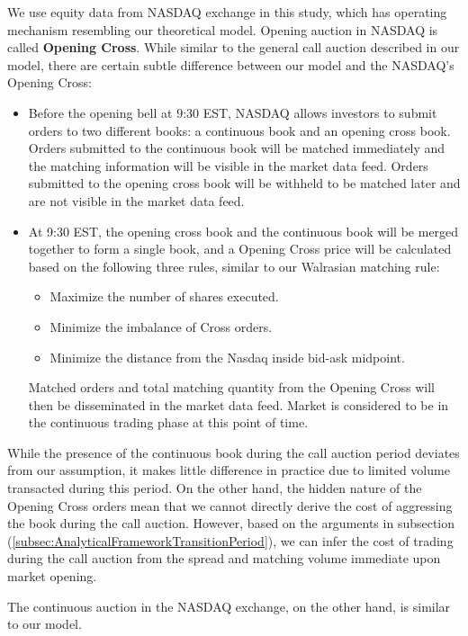 We use equity data from NASDAQ exchange in this study, which has operating mechanism resembling our theoretical model. Opening auction in NASDAQ is called \textbf{Opening Cross}. While similar to the general call auction described in our model, there are certain subtle difference between our model and the NASDAQ's Opening Cross:
\begin{itemize}
  \item Before the opening bell at 9:30 EST, NASDAQ allows investors to submit orders to two different books: a continuous book and an opening cross book. Orders submitted to the continuous book will be matched immediately and the matching information will be visible in the market data feed. Orders submitted to the opening cross book will be withheld to be matched later and are not visible in the market data feed.
  \item At 9:30 EST, the opening cross book and the continuous book will be merged together to form a single book, and a Opening Cross price will be calculated based on the following three rules, similar to our Walrasian matching rule:
        \begin{itemize}
          \item Maximize the number of shares executed.
          \item Minimize the imbalance of Cross orders.
          \item Minimize the distance from the Nasdaq inside bid-ask midpoint.
        \end{itemize}
        Matched orders and total matching quantity from the Opening Cross will then be disseminated in the market data feed. Market is considered to be in the continuous trading phase at this point of time.
\end{itemize}

While the presence of the continuous book during the call auction period deviates from our assumption, it makes little difference in practice due to limited volume transacted during this period. On the other hand, the hidden nature of the Opening Cross orders mean that we cannot directly derive the cost of aggressing the book during the call auction. However, based on the arguments in subsection (\ref{subsec:AnalyticalFrameworkTransitionPeriod}), we can infer the cost of trading during the call auction from the spread and matching volume immediate upon market opening.

The continuous auction in the NASDAQ exchange, on the other hand, is similar to our model.

